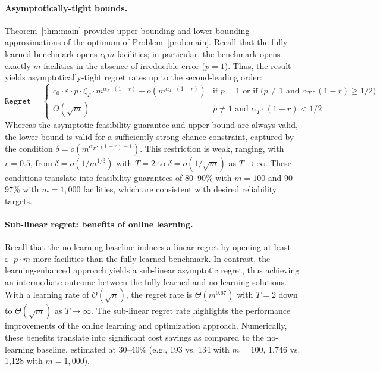\documentclass[nonblindrev]{informs3noheader}
\def\calO{\mathcal{O}}
\begin{document}
\paragraph{Asymptotically-tight bounds.}

Theorem~\ref{thm:main} provides upper-bounding and lower-bounding approximations of the optimum of Problem~\eqref{prob:main}. Recall that the fully-learned benchmark opens $c_0m$ facilities; in particular, the benchmark opens exactly $m$ facilities in the absence of irreducible error ($p=1$). Thus, the result yields asymptotically-tight regret rates up to the second-leading order:
	$$\texttt{Regret}=\begin{cases}
	    c_0\cdot\varepsilon\cdot p\cdot\zeta_T\cdot m^{\alpha_T\cdot(1-r)}+o\left(m^{\alpha_T\cdot(1-r)}\right)&\text{if $p=1$ or if ($p\neq1$ and $\alpha_T\cdot(1-r)\geq1/2$)}\\
        \Theta(\sqrt m)&\text{$p\neq1$ and $\alpha_T\cdot(1-r)<1/2$}
	\end{cases}$$
Whereas the asymptotic feasibility guarantee and upper bound are always valid, the lower bound is valid for a sufficiently strong chance constraint, captured by the condition $\delta = o\left(m^{\alpha_T\cdot(1-r)-1}\right)$. This restriction is weak, ranging, with $r=0.5$, from $\delta=o\left(1/m^{1/3}\right)$ with $T=2$ to $\delta=o\left(1/\sqrt m\right)$ as $T\to\infty$. These conditions translate into feasibility guarantees of 80--90\% with $m=100$ and 90--97\% with $m=1,000$ facilities, which are consistent with desired reliability targets.

\paragraph{Sub-linear regret: benefits of online learning.}

Recall that the no-learning baseline induces a linear regret by opening at least $\varepsilon\cdot p\cdot m$ more facilities than the fully-learned benchmark. In contrast, the learning-enhanced approach yields a sub-linear asymptotic regret, thus achieving an intermediate outcome between the fully-learned and no-learning solutions. With a learning rate of $\calO(\sqrt n)$, the regret rate is $\Theta\left(m^{0.67}\right)$ with $T=2$ down to $\Theta\left(\sqrt m\right)$ as $T\to\infty$. The sub-linear regret rate highlights the performance improvements of the online learning and optimization approach. Numerically, these benefits translate into significant cost savings as compared to the no-learning baseline, estimated at 30--40\% (e.g., 193 vs. 134 with $m=100$, 1,746 vs. 1,128 with $m=1,000$).
\end{document}
